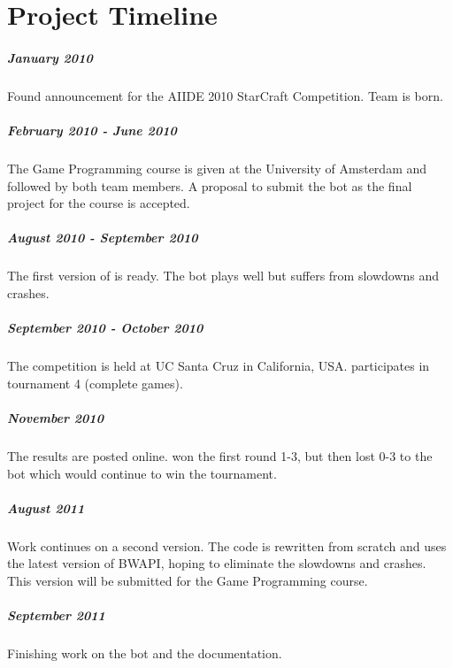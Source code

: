 
\chapter{Project Timeline}

\paragraph{January 2010}
Found announcement for the AIIDE 2010 StarCraft Competition. Team \massexpand is born.

\paragraph{February 2010 - June 2010}
The Game Programming course is given at the University of Amsterdam and followed by both team members. A proposal to submit the bot as the final project for the course is accepted.

\paragraph{August 2010 - September 2010}
The first version of \massexpand is ready. The bot plays well but suffers from slowdowns and crashes.

\paragraph{September 2010 - October 2010}
The competition is held at UC Santa Cruz in California, USA. \massexpand participates in tournament 4 (complete games).

\paragraph{November 2010}
The results are posted online. \massexpand won the first round 1-3, but then lost 0-3 to the bot which would continue to win the tournament.

\paragraph{August 2011}
Work continues on a second version. The code is rewritten from scratch and uses the latest version of BWAPI, hoping to eliminate the slowdowns and crashes. This version will be submitted for the Game Programming course.

\paragraph{September 2011}
Finishing work on the bot and the documentation.